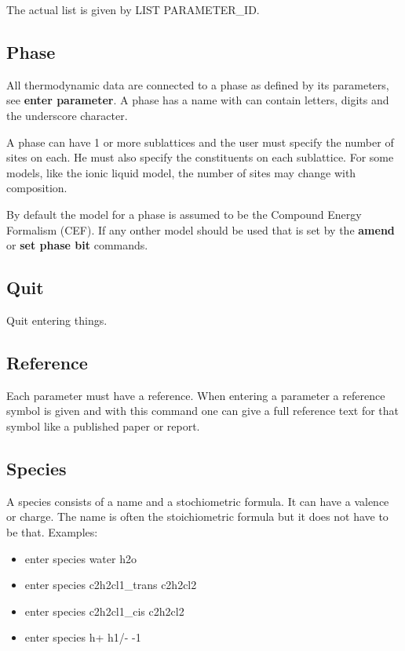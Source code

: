 \documentclass[12pt]{article}
\begin{document}
The actual list is given by LIST PARAMETER\_ID.

\subsection{Phase}

All thermodynamic data are connected to a phase as defined by its
parameters, see {\bf enter parameter}.  A phase has a name with can
contain letters, digits and the underscore character.

A phase can have 1 or more sublattices and the user must specify the
number of sites on each.  He must also specify the constituents on
each sublattice.  For some models, like the ionic liquid model, the
number of sites may change with composition.

By default the model for a phase is assumed to be the Compound Energy
Formalism (CEF).  If any onther model should be used that is set by
the {\bf amend} or {\bf set phase bit} commands.

\subsection{Quit}

Quit entering things.

\subsection{Reference}

Each parameter must have a reference.  When entering a parameter a
reference symbol is given and with this command one can give a full
reference text for that symbol like a published paper or report.

\subsection{Species}

A species consists of a name and a stochiometric formula.  It can have
a valence or charge.  The name is often the stoichiometric formula
but it does not have to be that.  Examples:

\begin{itemize}
\item enter species water h2o
\item enter species c2h2cl1\_trans c2h2cl2
\item enter species c2h2cl1\_cis c2h2cl2
\item enter species h+ h1/- -1
\end{itemize}
\end{document}
